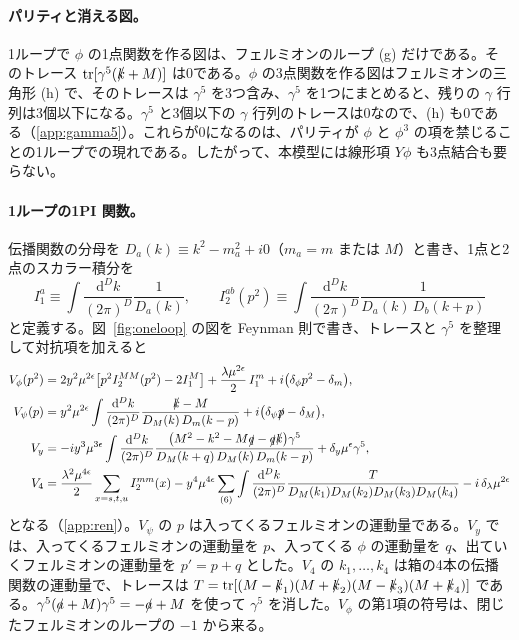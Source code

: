\documentclass[a4paper,10pt]{ltjsarticle}
\newcommand{\dd}{\mathrm{d}}
\begin{document}
\paragraph{パリティと消える図。}1ループで $\phi$ の1点関数を作る図は、フェルミオンのループ (g) だけである。そのトレース $\mathrm{tr}[\gamma^5(\slashed k+M)]$ は0である。$\phi$ の3点関数を作る図はフェルミオンの三角形 (h) で、そのトレースは $\gamma^5$ を3つ含み、$\gamma^5$ を1つにまとめると、残りの $\gamma$ 行列は3個以下になる。$\gamma^5$ と3個以下の $\gamma$ 行列のトレースは0なので、(h) も0である（\ref{app:gamma5}）。これらが0になるのは、パリティが $\phi$ と $\phi^3$ の項を禁じることの1ループでの現れである。したがって、本模型には線形項 $Y\phi$ も3点結合も要らない。

\paragraph{1ループの1PI 関数。}伝播関数の分母を $D_a(k)\equiv k^2-m_a^2+i0$（$m_a=m$ または $M$）と書き、1点と2点のスカラー積分を
\begin{equation}
I_1^a\equiv\int\frac{\dd^Dk}{(2\pi)^D}\frac{1}{D_a(k)},\qquad
I_2^{ab}(p^2)\equiv\int\frac{\dd^Dk}{(2\pi)^D}\frac{1}{D_a(k)\,D_b(k+p)}
\label{eq:IN}
\end{equation}
と定義する。図~\ref{fig:oneloop} の図を Feynman 則で書き、トレースと $\gamma^5$ を整理して対抗項を加えると
\begin{equation}
\begin{aligned}
V_\phi(p^2)&=2y^2\mu^{2\epsilon}\bigl[p^2I_2^{MM}(p^2)-2I_1^M\bigr]+\frac{\lambda\mu^{2\epsilon}}{2}\,I_1^m+i\bigl(\delta_\phi p^2-\delta_m\bigr),\\
V_\psi(p)&=y^2\mu^{2\epsilon}\int\frac{\dd^Dk}{(2\pi)^D}\frac{\slashed k-M}{D_M(k)\,D_m(k-p)}+i\bigl(\delta_\psi\slashed p-\delta_M\bigr),\\
V_y&=-iy^3\mu^{3\epsilon}\int\frac{\dd^Dk}{(2\pi)^D}\frac{\bigl(M^2-k^2-M\slashed q-\slashed q\slashed k\bigr)\gamma^5}{D_M(k+q)\,D_M(k)\,D_m(k-p)}+\delta_y\mu^\epsilon\gamma^5,\\
V_4&=\frac{\lambda^2\mu^{4\epsilon}}{2}\sum_{x=s,t,u}I_2^{mm}(x)-y^4\mu^{4\epsilon}\sum_{(6)}\int\frac{\dd^Dk}{(2\pi)^D}\frac{T}{D_M(k_1)D_M(k_2)D_M(k_3)D_M(k_4)}-i\,\delta_\lambda\mu^{2\epsilon}
\end{aligned}
\label{eq:V}
\end{equation}
となる（\ref{app:ren}）。$V_\psi$ の $p$ は入ってくるフェルミオンの運動量である。$V_y$ では、入ってくるフェルミオンの運動量を $p$、入ってくる $\phi$ の運動量を $q$、出ていくフェルミオンの運動量を $p'=p+q$ とした。$V_4$ の $k_1,\dots,k_4$ は箱の4本の伝播関数の運動量で、トレースは $T=\mathrm{tr}[(M-\slashed k_1)(M+\slashed k_2)(M-\slashed k_3)(M+\slashed k_4)]$ である。$\gamma^5(\slashed a+M)\gamma^5=-\slashed a+M$ を使って $\gamma^5$ を消した。$V_\phi$ の第1項の符号は、閉じたフェルミオンのループの $-1$ から来る。
\end{document}
